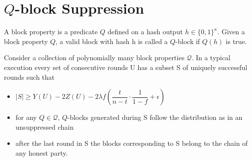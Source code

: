 \section{$Q$-block Suppression}
\begin{definition}
    \cite{dionyziz}
    A block property is a predicate $Q$ defined on a hash output $h \in \{ 0, 1 \}^\kappa$. Given  a block property $Q$, a valid block with hash h is called a $Q$-block if $Q(h)$ is true.
\end{definition}

\begin{lemma}[Unsuppressibility]\cite{dionyziz}
    Consider a collection of polynomially many block properties $\mathcal{Q}$. In a typical execution every set of consecutive rounds U has a subset S of uniquely successful rounds such that
    \begin{itemize}
        \item $\lvert S \rvert \geq Y(U) - 2Z(U) - 2 \lambda f (\dfrac{t}{n-t} \cdot \dfrac{1}{1-f} + \epsilon)$
        \item for any $Q \in \mathcal{Q}$, $Q$-blocks generated during S follow the distribution as in an unsuppressed chain
        \item after the last round in S the blocks corresponding to S belong to the chain of any honest party.
    \end{itemize}
\end{lemma}


